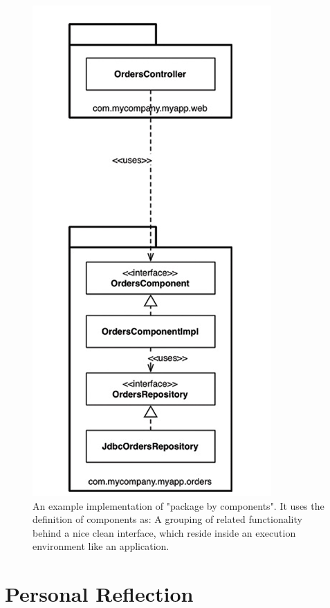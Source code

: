 \documentclass[../Main.tex]{subfiles}
\begin{document}
\begin{figure}[H]
    \centering
    \includegraphics[width=0.5\linewidth]{Images/cleanarch/package-by-components-example.png}
    \caption{An example implementation of "package by components". It uses the definition of components as:
    A grouping of related functionality behind a nice clean interface, which reside inside an execution environment like an application.}
\end{figure}

\newpage

\section{Personal Reflection}
\end{document}
